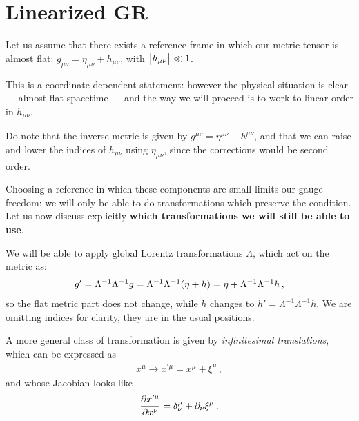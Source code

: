 \documentclass[main.tex]{subfiles}
\begin{document}
\section{Linearized GR}




Let us assume that there exists a reference frame in which our metric tensor is almost flat: \(g_{\mu \nu } = \eta_{\mu \nu } + h_{\mu \nu }\), with \(\abs{h_{\mu \nu }} \ll 1\).

This is a coordinate dependent statement: however the physical situation is clear --- almost flat spacetime --- and the way we will proceed is to work to linear order in \(h_{\mu \nu }\).

Do note that the inverse metric is given by \(g^{\mu \nu } = \eta^{\mu \nu } - h^{\mu \nu }\), and that we can raise and lower the indices of \(h_{\mu \nu }\) using \(\eta_{\mu \nu }\), since the corrections would be second order.

Choosing a reference in which these components are small limits our gauge freedom: we will only be able to do transformations which preserve the condition. Let us now discuss explicitly \textbf{which transformations we will still be able to use}. 

We will be able to apply global Lorentz transformations \(\Lambda \), which act on the metric as: 
%
\begin{align}
g' = \Lambda^{-1} \Lambda^{-1} g
= \Lambda^{-1} \Lambda^{-1} \qty(\eta + h) 
= \eta + \Lambda^{-1} \Lambda^{-1} h
\,,
\end{align}
%
so the flat metric part does not change, while \(h\) changes to  \(h' = \Lambda^{-1} \Lambda^{-1} h\).
We are omitting indices for clarity, they are in the usual positions. 

A more general class of transformation is given by \emph{infinitesimal translations}, which can be expressed as 
%
\begin{align}
x^{\mu } \rightarrow x^{\prime \mu } = x^{\mu } + \xi^{\mu }
\,,
\end{align}
%
and whose Jacobian looks like 
%
\begin{align}
\pdv{x^{\prime \mu }}{x^{\nu }} = 
\delta^{ \mu }_{\nu } + \partial_{\nu } \xi^{ \mu }
\,.
\end{align}
\end{document}
